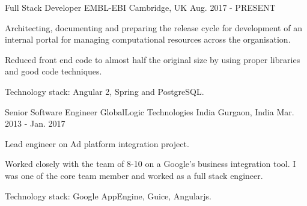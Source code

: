 

\begin{cventries}

  \cventry
    {Full Stack Developer} %
    {EMBL-EBI} %
    {Cambridge, UK} %
    {Aug. 2017 - PRESENT} %
    {
      \begin{cvitems} %
        \item {Architecting, documenting  and preparing the release cycle for development of an internal portal for managing computational resources across the organisation.}
        \item {Reduced front end code to almost half the original size by using proper libraries and good code techniques.}
        \item {Technology stack: Angular 2, Spring and PostgreSQL.}
      \end{cvitems}
    }

  \cventry
    {Senior Software Engineer} %
    {GlobalLogic Technologies India} %
    {Gurgaon, India} %
    {Mar. 2013 - Jan. 2017} %
    {
      \begin{cvitems} %
        \item {Lead engineer on Ad platform integration project.}
        \item {Worked closely with the team of 8-10 on a Google’s business integration tool. I was one of the core team member and worked as a full stack engineer.}
        \item {Technology stack: Google AppEngine, Guice, Angularjs.}
      \end{cvitems}
    }


\end{cventries}
